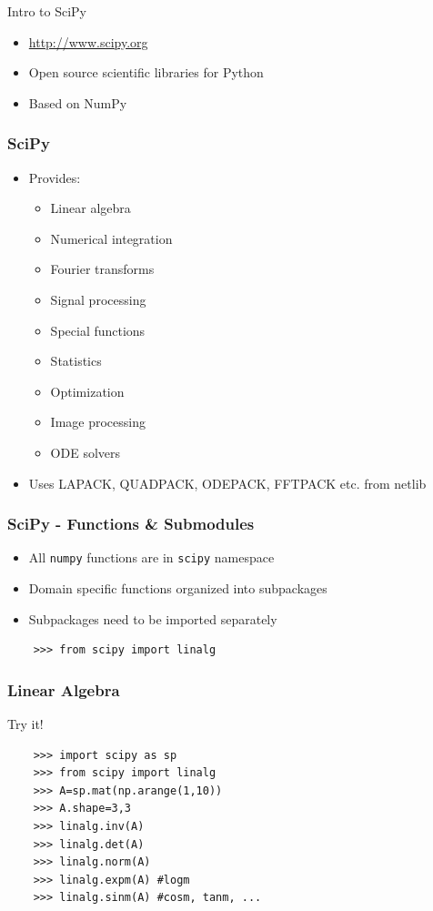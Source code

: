 \documentclass[14pt,compress]{beamer}
\newcommand{\typ}[1]{\lstinline{#1}}
\begin{document}
\begin{frame}
    {Intro to SciPy}
  \begin{itemize}
  \item \url{http://www.scipy.org}
  \item Open source scientific libraries for Python
  \item Based on NumPy
    \end{itemize}
\end{frame}

\begin{frame}
  \frametitle{SciPy}
  \begin{itemize}
  \item Provides:
    \begin{itemize}
    \item Linear algebra
    \item Numerical integration
    \item Fourier transforms
    \item Signal processing
    \item Special functions
    \item Statistics
    \item Optimization
    \item Image processing
    \item ODE solvers
    \end{itemize}
  \item Uses LAPACK, QUADPACK, ODEPACK, FFTPACK etc. from netlib
  \end{itemize}
\end{frame}

\begin{frame}[fragile]
  \frametitle{SciPy - Functions \& Submodules}
  \begin{itemize}
    \item All \typ{numpy} functions are in \typ{scipy} namespace
    \item Domain specific functions organized into subpackages
    \item Subpackages need to be imported separately
  \end{itemize}
  \begin{lstlisting}
    >>> from scipy import linalg
  \end{lstlisting}
\end{frame}

\begin{frame}[fragile]
  \frametitle{Linear Algebra}
  Try it!
  \begin{lstlisting}
    >>> import scipy as sp
    >>> from scipy import linalg
    >>> A=sp.mat(np.arange(1,10))
    >>> A.shape=3,3
    >>> linalg.inv(A)
    >>> linalg.det(A)
    >>> linalg.norm(A)
    >>> linalg.expm(A) #logm
    >>> linalg.sinm(A) #cosm, tanm, ...
  \end{lstlisting}
\end{frame}
\end{document}
